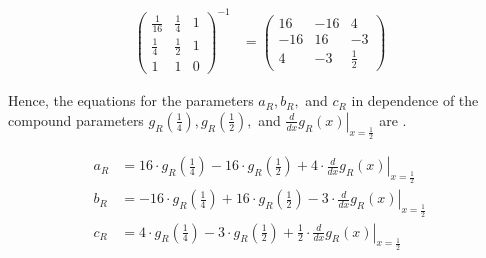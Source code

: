 \begin{align}
	\begin{pmatrix}
		\frac{1}{16} & \frac{1}{4} & 1 \\
		\frac{1}{4}  & \frac{1}{2} & 1 \\
		1            & 1           & 0
	\end{pmatrix}^{-1} & =
	\begin{pmatrix}
		16  & -16 & 4           \\
		-16 & 16  & -3          \\
		4   & -3  & \frac{1}{2}
	\end{pmatrix}
	\label{equ:setup.quad.hyper.matrix}
\end{align}

Hence, the equations for the parameters $a_R, b_R,$ and $c_R$ in dependence of the compound parameters $g_R\left(\frac{1}{4}\right), g_R\left(\frac{1}{2}\right),$ and $\left. \frac{d}{dx} g_R\left(x\right) \right|_{x = \frac{1}{2}}$ are .

\begin{align}
	a_R & = 16 \cdot g_R\left(\frac{1}{4}\right) - 16 \cdot g_R\left(\frac{1}{2}\right) + 4 \cdot \left. \frac{d}{dx} g_R\left(x\right) \right|_{x = \frac{1}{2}}     \label{equ:setup.quad.hyper.aR}     \\
	b_R & = -16 \cdot g_R\left(\frac{1}{4}\right) + 16 \cdot g_R\left(\frac{1}{2}\right) - 3 \cdot \left. \frac{d}{dx} g_R\left(x\right) \right|_{x = \frac{1}{2}} \label{equ:setup.quad.hyper.bR}        \\
	c_R & = 4 \cdot g_R\left(\frac{1}{4}\right) - 3 \cdot g_R\left(\frac{1}{2}\right) + \frac{1}{2} \cdot \left. \frac{d}{dx} g_R\left(x\right) \right|_{x = \frac{1}{2}} \label{equ:setup.quad.hyper.cR}
\end{align}
